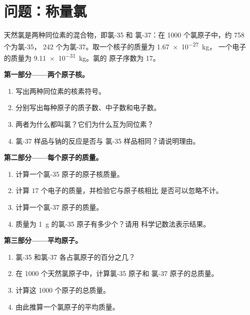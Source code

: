 \section{问题：称量氯}

\begin{problem}
\label{pb:g9:inside-the-atom:1}
天然氯是两种同位素的混合物，即氯-35 和
氯-37：在 1000 个氯原子中，约 758 个为氯-35，
242 个为氯-37。取一个核子的质量为 \qty{1.67e-27}{kg}，
一个电子的质量为 \qty{9.11e-31}{kg}。氯的
原子序数为 17。

\medskip
\noindent\textbf{第一部分——两个原子核。}
\begin{enumerate}
  \item 写出两种同位素的核素符号。
  \item 分别写出每种原子的质子数、中子数和电子数。
  \item 两者为什么都叫氯？它们为什么互为同位素？
  \item 氯-37 样品与钠的反应是否与
        氯-35 样品相同？请说明理由。
\end{enumerate}

\medskip
\noindent\textbf{第二部分——每个原子的质量。}
\begin{enumerate}[resume]
  \item 计算一个氯-35 原子的原子核质量。
  \item 计算 17 个电子的质量，并检验它与原子核相比
        是否可以忽略不计。
  \item 计算一个氯-37 原子的质量。
  \item 质量为 \qty{1}{g} 的氯-35 原子有多少个？请用
        科学记数法表示结果。
\end{enumerate}

\medskip
\noindent\textbf{第三部分——平均原子。}
\begin{enumerate}[resume]
  \item 氯-35 和氯-37 各占氯原子的百分之几？
  \item 在 1000 个天然氯原子中，计算氯-35 原子和
        氯-37 原子的总质量。
  \item 计算这 1000 个原子的总质量。
  \item 由此推算一个氯原子的平均质量。
\end{enumerate}
\end{problem}
